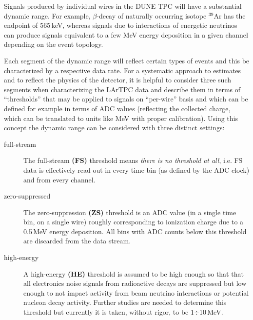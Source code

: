 Signals produced by individual wires in the DUNE TPC will have a substantial
dynamic range. For example, $\beta$-decay of naturally occurring isotope $^{39}$Ar has the endpoint of
565\,keV, whereas signals due to interactions of energetic neutrinos can produce signals
equivalent to a few MeV energy deposition in a given channel depending on the event topology.

Each segment of the dynamic range will reflect certain types of events and this
be characterized by a respective data rate. For a systematic approach to estimates
and to reflect the physics of the detector,
it is helpful to consider three such segments when characterizing the LArTPC data and describe
them in terms of ``thresholds'' that may be applied to signals on ``per-wire'' basis and which can be
defined for example
in terms of ADC values (reflecting the collected charge, which can be translated to units like MeV with proper calibration).
Using this concept the dynamic range can be considered with three distinct settings:
\begin{description}
	
\item[full-stream] The full-stream \textbf{(FS)} threshold means \textit{there is no threshold at all}, i.e.
FS data is effectively read out in every time bin (as defined by the ADC clock) and from every channel.

\item[zero-suppressed] The zero-suppression \textbf{(ZS)} threshold is an ADC value (in a single time bin,
on a single wire) roughly corresponding to ionization charge due to a 0.5\,MeV energy deposition.
All bins with ADC counts below this threshold are discarded from the data stream.

\item[high-energy] A high-energy \textbf{(HE)} threshold is assumed to be high enough so that
  that all electronics noise signals from radioactive decays are suppressed but low
  enough to not impact activity from beam neutrino interactions or potential nucleon decay activity.
  Further studies are needed to determine this threshold but currently
  it is taken, without rigor, to be 1$\div$10\,MeV.

\end{description}

